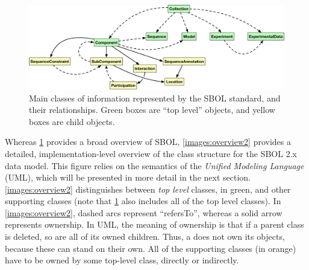 \begin{figure}[ht]
\begin{center}
\includegraphics[scale=0.7]{images/datamodel.pdf}
\caption{Main classes of information represented by the SBOL standard, and their relationships.  Green boxes are ``top level'' objects, and yellow boxes are child objects.}
\label{images:overview1}
\end{center}
\end{figure}

Whereas \ref{images:overview1} provides a broad overview of SBOL, \ref{images:overview2} provides a detailed, implementation-level overview of the class structure for the SBOL 2.x data model. This figure relies on the semantics of the \emph{Unified Modeling Language} (UML), which will be presented in more detail in the next section. \ref{images:overview2} distinguishes between \emph{top level} classes, in green, and other supporting classes (note that \ref{images:overview1} also includes all of the top level classes). In \ref{images:overview2}, dashed arcs represent ``refersTo'', whereas a solid arrow represents ownership. In UML, the meaning of ownership is that if a parent class is deleted, so are all of its owned children. Thus, a  does not own its
 objects, because these can stand on their own. All of the supporting classes (in orange) have to be owned by some top-level class, directly or indirectly. 


